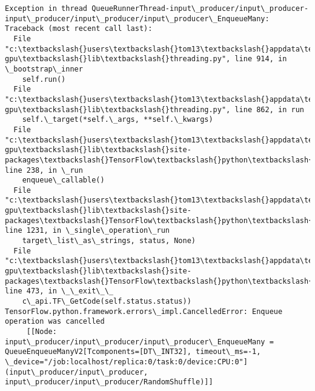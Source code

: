 \documentclass[11pt]{article}
\begin{document}
\begin{Verbatim}[commandchars=\\\{\}]
Exception in thread QueueRunnerThread-input\_producer/input\_producer-input\_producer/input\_producer/input\_producer\_EnqueueMany:
Traceback (most recent call last):
  File "c:\textbackslash{}users\textbackslash{}tom13\textbackslash{}appdata\textbackslash{}local\textbackslash{}conda\textbackslash{}conda\textbackslash{}envs\textbackslash{}TensorFlow-gpu\textbackslash{}lib\textbackslash{}threading.py", line 914, in \_bootstrap\_inner
    self.run()
  File "c:\textbackslash{}users\textbackslash{}tom13\textbackslash{}appdata\textbackslash{}local\textbackslash{}conda\textbackslash{}conda\textbackslash{}envs\textbackslash{}TensorFlow-gpu\textbackslash{}lib\textbackslash{}threading.py", line 862, in run
    self.\_target(*self.\_args, **self.\_kwargs)
  File "c:\textbackslash{}users\textbackslash{}tom13\textbackslash{}appdata\textbackslash{}local\textbackslash{}conda\textbackslash{}conda\textbackslash{}envs\textbackslash{}TensorFlow-gpu\textbackslash{}lib\textbackslash{}site-packages\textbackslash{}TensorFlow\textbackslash{}python\textbackslash{}training\textbackslash{}queue\_runner\_impl.py", line 238, in \_run
    enqueue\_callable()
  File "c:\textbackslash{}users\textbackslash{}tom13\textbackslash{}appdata\textbackslash{}local\textbackslash{}conda\textbackslash{}conda\textbackslash{}envs\textbackslash{}TensorFlow-gpu\textbackslash{}lib\textbackslash{}site-packages\textbackslash{}TensorFlow\textbackslash{}python\textbackslash{}client\textbackslash{}session.py", line 1231, in \_single\_operation\_run
    target\_list\_as\_strings, status, None)
  File "c:\textbackslash{}users\textbackslash{}tom13\textbackslash{}appdata\textbackslash{}local\textbackslash{}conda\textbackslash{}conda\textbackslash{}envs\textbackslash{}TensorFlow-gpu\textbackslash{}lib\textbackslash{}site-packages\textbackslash{}TensorFlow\textbackslash{}python\textbackslash{}framework\textbackslash{}errors\_impl.py", line 473, in \_\_exit\_\_
    c\_api.TF\_GetCode(self.status.status))
TensorFlow.python.framework.errors\_impl.CancelledError: Enqueue operation was cancelled
	 [[Node: input\_producer/input\_producer/input\_producer\_EnqueueMany = QueueEnqueueManyV2[Tcomponents=[DT\_INT32], timeout\_ms=-1, \_device="/job:localhost/replica:0/task:0/device:CPU:0"](input\_producer/input\_producer, input\_producer/input\_producer/RandomShuffle)]]


\end{Verbatim}
\end{document}
